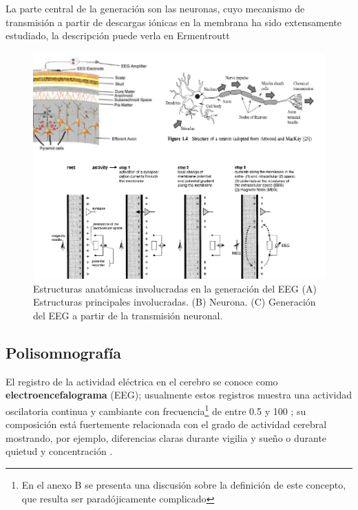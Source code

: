 

La parte central de la generación son las neuronas, cuyo mecanismo de transmisión a partir de
descargas iónicas en la membrana ha sido extensamente estudiado, la descripción puede verla en
Ermentroutt

\begin{figure}
\centering
\includegraphics[width=\linewidth]{./img_diagramas/electrofisiologia.pdf} 
\caption[Estructuras anatómicas involucradas en la generación del EEG]{Estructuras anatómicas 
involucradas en la generación del EEG (A) Estructuras principales involucradas. (B) Neurona. 
(C) Generación del EEG a partir de la transmisión neuronal.
}
\label{electro_fisio}
\end{figure}


\subsection{Polisomnografía}

El registro de la actividad eléctrica en el cerebro se conoce como \textbf{electroencefalograma} 
(EEG); usualmente estos registros muestra una actividad oscilatoria continua y cambiante con 
frecuencia\footnote{En el anexo B se presenta una discusión sobre la definición de este concepto, 
que resulta ser paradójicamente complicado} de entre 0.5 y 100 \hz; su composición está fuertemente 
relacionada con el grado de actividad cerebral mostrando, por ejemplo, diferencias claras durante 
vigilia y sueño o durante quietud y concentración \cite{Clark98_2}.

